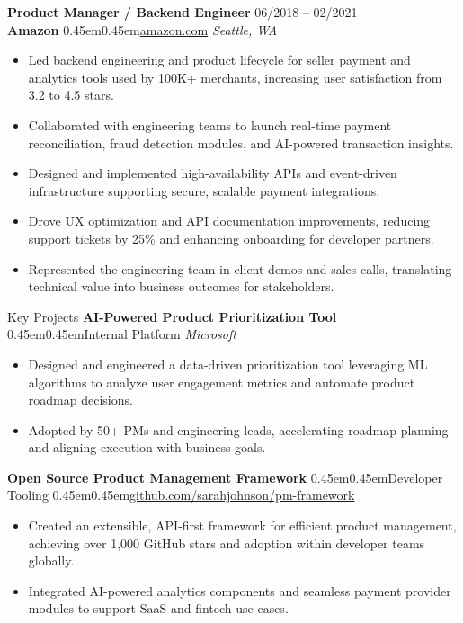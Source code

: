 \documentclass[10pt, letterpaper]{article}
\makeatletter
\renewcommand{\section}{%
  \@startsection{section}{1}{\z@}{10pt}{6pt}{%
    \Large\bfseries\color{black}%
  }%
}
\newcommand{\bull}{\kern0.45em\textbullet\kern0.45em}
\newcommand{\role}[1]{\textbf{#1}}
\newcommand{\org}[1]{\textbf{#1}}
\newcommand{\place}[1]{\textit{#1}}
\makeatother
\begin{document}
\role{Product Manager / Backend Engineer} \hfill 06/2018 -- 02/2021 \\
\org{Amazon} \bull \href{https://amazon.com}{amazon.com} \hfill \place{Seattle, WA}
\begin{itemize}
  \item Led backend engineering and product lifecycle for seller payment and analytics tools used by 100K+ merchants, increasing user satisfaction from 3.2 to 4.5 stars.
  \item Collaborated with engineering teams to launch real-time payment reconciliation, fraud detection modules, and AI-powered transaction insights.
  \item Designed and implemented high-availability APIs and event-driven infrastructure supporting secure, scalable payment integrations.
  \item Drove UX optimization and API documentation improvements, reducing support tickets by 25\% and enhancing onboarding for developer partners.
  \item Represented the engineering team in client demos and sales calls, translating technical value into business outcomes for stakeholders.
\end{itemize}
\vspace{12pt}

\section{Key Projects}
\org{AI-Powered Product Prioritization Tool} \bull Internal Platform \hfill \place{Microsoft}
\begin{itemize}
  \item Designed and engineered a data-driven prioritization tool leveraging ML algorithms to analyze user engagement metrics and automate product roadmap decisions.
  \item Adopted by 50+ PMs and engineering leads, accelerating roadmap planning and aligning execution with business goals.
\end{itemize}

\org{Open Source Product Management Framework} \bull Developer Tooling \bull \href{https://github.com/sarahjohnson/pm-framework}{github.com/sarahjohnson/pm-framework}
\begin{itemize}
  \item Created an extensible, API-first framework for efficient product management, achieving over 1,000 GitHub stars and adoption within developer teams globally.
  \item Integrated AI-powered analytics components and seamless payment provider modules to support SaaS and fintech use cases.
\end{itemize}
\end{document}
